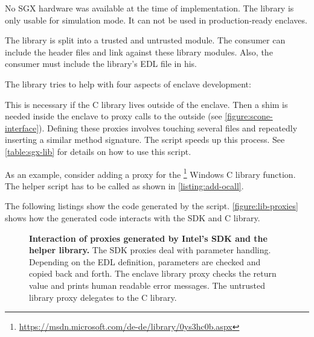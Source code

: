 No SGX hardware was available at the time of implementation. The library is only usable for simulation mode. It can not be used in production-ready enclaves.\label{ID_1484453818}

The library is split into a trusted and untrusted module.\label{ID_1011030349}
The consumer can include the header files and link against these library modules.\label{ID_1462993309}
Also, the consumer must include the library's EDL file in his.\label{ID_1600152309}

The library tries to help with four aspects of enclave development:\label{ID_1627717648}
\begin{description}\label{ID_1696400236}
\item[Generate O-call proxies:]\label{ID_1577901159}
This is necessary if the C library lives outside of the enclave. Then a shim is needed inside the enclave to proxy calls to the outside (see \autoref{figure:scone-interface}).\label{ID_1843451651}
Defining these proxies involves touching several files and repeatedly inserting a similar method signature.\label{ID_1189822781}
The  script speeds up this process.\label{ID_1596596706}
See \autoref{table:sgx-lib} for details on how to use this script.\label{ID_1961827742}

As an example, consider adding a proxy for the \footnote{\url{https://msdn.microsoft.com/de-de/library/0ys3hc0b.aspx}} Windows C library function.\label{ID_2348280}
The helper script has to be called as shown in \autoref{listing:add-ocall}.\label{ID_1088589749}


The following listings show the code generated by the script. \autoref{figure:lib-proxies} shows how the generated code interacts with the SDK and C library.\label{ID_774243892}
\begin{figure}[htbp]
\makebox[\textwidth][c]{
}\caption{\textbf{Interaction of proxies generated by Intel's SDK and the helper library.}\label{ID_1914549896}
The SDK proxies deal with parameter handling. Depending on the EDL definition, parameters are checked and copied back and forth.\label{ID_331655439}
The enclave library proxy checks the return value and prints human readable error messages. The untrusted library proxy delegates to the C library.\label{ID_1047121255}
\label{ID_811027800}\label{figure:lib-proxies}}
\end{figure}


\end{description}
